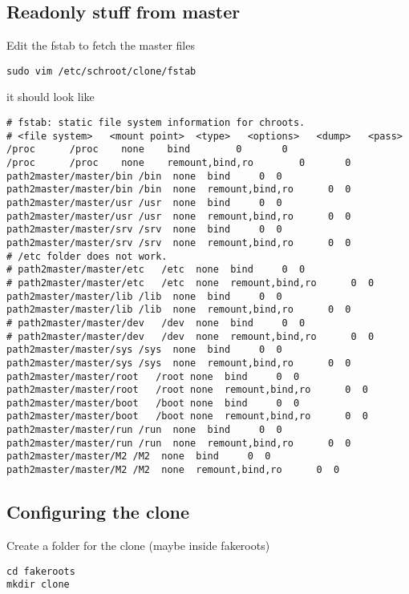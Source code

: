 \documentclass[a4paper]{article}
\begin{document}
\subsection{Readonly stuff from master}

Edit the fstab to fetch the master files

\begin{verbatim}
sudo vim /etc/schroot/clone/fstab
\end{verbatim}

it should look like

\begin{verbatim}
# fstab: static file system information for chroots.
# <file system>   <mount point>  <type>   <options>   <dump>   <pass>
/proc      /proc    none    bind        0       0
/proc      /proc    none    remount,bind,ro        0       0
path2master/master/bin /bin  none  bind     0  0
path2master/master/bin /bin  none  remount,bind,ro      0  0
path2master/master/usr /usr  none  bind     0  0
path2master/master/usr /usr  none  remount,bind,ro      0  0
path2master/master/srv /srv  none  bind     0  0
path2master/master/srv /srv  none  remount,bind,ro      0  0
# /etc folder does not work.
# path2master/master/etc   /etc  none  bind     0  0
# path2master/master/etc   /etc  none  remount,bind,ro      0  0
path2master/master/lib /lib  none  bind     0  0
path2master/master/lib /lib  none  remount,bind,ro      0  0
# path2master/master/dev   /dev  none  bind     0  0
# path2master/master/dev   /dev  none  remount,bind,ro      0  0
path2master/master/sys /sys  none  bind     0  0
path2master/master/sys /sys  none  remount,bind,ro      0  0
path2master/master/root   /root none  bind     0  0
path2master/master/root   /root none  remount,bind,ro      0  0
path2master/master/boot   /boot none  bind     0  0
path2master/master/boot   /boot none  remount,bind,ro      0  0
path2master/master/run /run  none  bind     0  0
path2master/master/run /run  none  remount,bind,ro      0  0
path2master/master/M2 /M2  none  bind     0  0
path2master/master/M2 /M2  none  remount,bind,ro      0  0
\end{verbatim}

\subsection{Configuring the clone}

Create a folder for the clone (maybe inside fakeroots)

\begin{verbatim}
cd fakeroots
mkdir clone
\end{verbatim}
\end{document}
